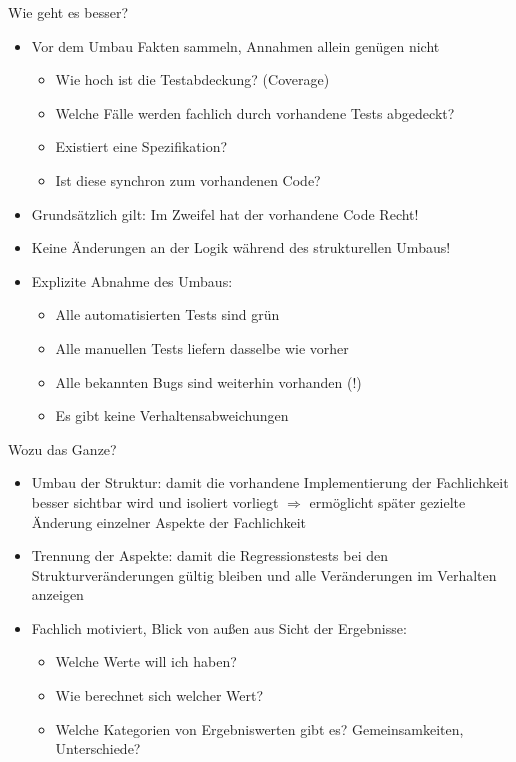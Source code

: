 \begin{frame}[fragile]{Wie geht es besser?}
\begin{itemize}
\item Vor dem Umbau Fakten sammeln, Annahmen allein genügen nicht
\begin{itemize}
\item Wie hoch ist die Testabdeckung? (Coverage)
\item Welche Fälle werden fachlich durch vorhandene Tests abgedeckt?
\item Existiert eine Spezifikation?
\item Ist diese synchron zum vorhandenen Code?
\end{itemize}

\item Grundsätzlich gilt: Im Zweifel hat der vorhandene Code Recht!

\item Keine Änderungen an der Logik während des strukturellen Umbaus!

\item Explizite Abnahme des Umbaus:
\begin{itemize}
\item Alle automatisierten Tests sind grün
\item Alle manuellen Tests liefern dasselbe wie vorher
\item Alle bekannten Bugs sind weiterhin vorhanden (!)
\item Es gibt keine Verhaltensabweichungen
\end{itemize}

\end{itemize}
\end{frame}



\begin{frame}[fragile]{Wozu das Ganze?}
\begin{itemize}
\item Umbau der Struktur: damit die vorhandene Implementierung der Fachlichkeit besser sichtbar wird und isoliert vorliegt \newline
$\Rightarrow$ ermöglicht später gezielte Änderung einzelner Aspekte der Fachlichkeit
\item Trennung der Aspekte: damit die Regressionstests bei den Strukturveränderungen gültig bleiben und alle Veränderungen im Verhalten anzeigen
\item Fachlich motiviert, Blick von außen aus Sicht der Ergebnisse:
\begin{itemize}
\item Welche Werte will ich haben?
\item Wie berechnet sich welcher Wert?
\item Welche Kategorien von Ergebniswerten gibt es? Gemeinsamkeiten, Unterschiede?
\end{itemize}
\end{itemize}
\end{frame}


